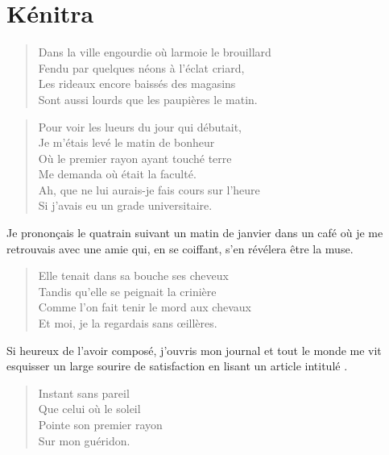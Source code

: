 \section*{Kénitra}

\begin{verse}
Dans la ville engourdie où larmoie le brouillard\\
Fendu par quelques néons à l’éclat criard,\\
Les rideaux encore baissés des magasins\\
Sont aussi lourds que les paupières le matin.
\end{verse}

\begin{verse}
Pour voir les lueurs du jour qui débutait,\\
Je m’étais levé le matin de bonheur\\
Où le premier rayon ayant touché terre\\
Me demanda où était la faculté.\\
Ah, que ne lui aurais-je fais cours sur l’heure\\
Si j’avais eu un grade universitaire.
\end{verse}

\begin{prose}
Je prononçais le quatrain suivant un matin de janvier dans un café où je me retrouvais avec une amie  qui, en se coiffant, s’en révélera être la muse.
\end{prose}

\begin{verse}
Elle tenait dans sa bouche ses cheveux\\
Tandis qu’elle se peignait la crinière\\
Comme l’on fait tenir le mord aux chevaux\\
Et moi, je la regardais sans œillères.
\end{verse}

\begin{prose}
Si heureux de l’avoir composé, j’ouvris mon journal et tout le monde me vit esquisser un large sourire de satisfaction en lisant un article intitulé .
\end{prose}

\begin{verse}
Instant sans pareil\\
Que celui où le soleil\\
Pointe son premier rayon\\
Sur mon guéridon.
\end{verse}

